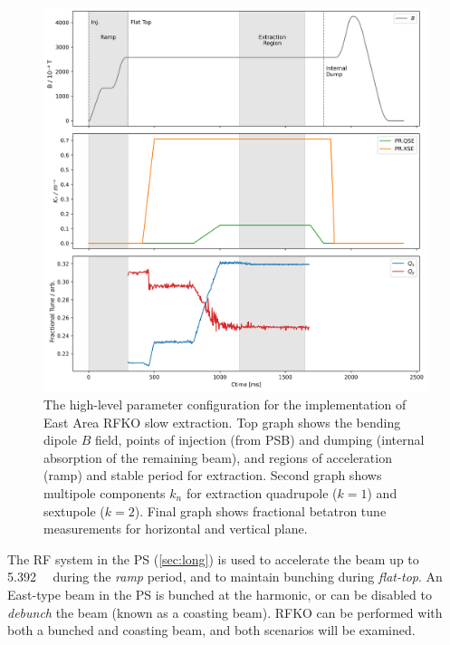 \documentclass[a4paper,twoside,11pt]{report}
\begin{document}
\begin{figure}[h]
  \centering
  \includegraphics[width=0.9\linewidth]{cyclegraphs.png}
  \caption[High-level parameter graphs and tune measurements during RFKO slow extraction]{The high-level parameter configuration for the implementation of East Area RFKO slow extraction. Top graph shows the bending dipole $B$ field, points of injection (from PSB) and dumping (internal absorption of the remaining beam), and regions of acceleration (ramp) and stable period for extraction. Second graph shows multipole components $k_n$ for extraction quadrupole ($k=1$) and sextupole ($k=2$). Final graph shows fractional betatron tune measurements for horizontal and vertical plane.}\label{fig:cycle}
\end{figure}

The RF system in the PS (\autoref{sec:long}) is used to accelerate the beam up to \qty{5.392}{\giga\eVperc} during the \textit{ramp} period, and to maintain bunching during \textit{flat-top}. An East-type beam in the PS is bunched at the  harmonic, or can be disabled to \textit{debunch} the beam (known as a coasting beam). RFKO can be performed with both a bunched and coasting beam, and both scenarios will be examined.
\end{document}

